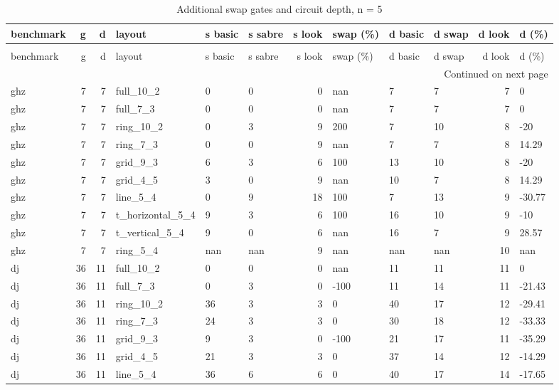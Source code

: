 \begin{longtable}{lrrlllrlllrl}
\caption{Additional swap gates and circuit depth, n = 5} \label{benchmark-table-5} \\
\toprule
benchmark & g & d & layout & s basic & s sabre & s look & swap (\%) & d basic & d swap & d look & d (\%) \\
\midrule
\endfirsthead
\caption[]{Additional swap gates and circuit depth, n = 5} \\
\toprule
benchmark & g & d & layout & s basic & s sabre & s look & swap (\%) & d basic & d swap & d look & d (\%) \\
\midrule
\endhead
\midrule
\multicolumn{12}{r}{Continued on next page} \\
\midrule
\endfoot
\bottomrule
\endlastfoot
ghz & 7 & 7 & full\_10\_2 & 0 & 0 & 0 & nan & 7 & 7 & 7 & 0 \\
ghz & 7 & 7 & full\_7\_3 & 0 & 0 & 0 & nan & 7 & 7 & 7 & 0 \\
ghz & 7 & 7 & ring\_10\_2 & 0 & 3 & 9 & 200 & 7 & 10 & 8 & -20 \\
ghz & 7 & 7 & ring\_7\_3 & 0 & 0 & 9 & nan & 7 & 7 & 8 & 14.29 \\
ghz & 7 & 7 & grid\_9\_3 & 6 & 3 & 6 & 100 & 13 & 10 & 8 & -20 \\
ghz & 7 & 7 & grid\_4\_5 & 3 & 0 & 9 & nan & 10 & 7 & 8 & 14.29 \\
ghz & 7 & 7 & line\_5\_4 & 0 & 9 & 18 & 100 & 7 & 13 & 9 & -30.77 \\
ghz & 7 & 7 & t\_horizontal\_5\_4 & 9 & 3 & 6 & 100 & 16 & 10 & 9 & -10 \\
ghz & 7 & 7 & t\_vertical\_5\_4 & 9 & 0 & 6 & nan & 16 & 7 & 9 & 28.57 \\
ghz & 7 & 7 & ring\_5\_4 & nan & nan & 9 & nan & nan & nan & 10 & nan \\
dj & 36 & 11 & full\_10\_2 & 0 & 0 & 0 & nan & 11 & 11 & 11 & 0 \\
dj & 36 & 11 & full\_7\_3 & 0 & 3 & 0 & -100 & 11 & 14 & 11 & -21.43 \\
dj & 36 & 11 & ring\_10\_2 & 36 & 3 & 3 & 0 & 40 & 17 & 12 & -29.41 \\
dj & 36 & 11 & ring\_7\_3 & 24 & 3 & 3 & 0 & 30 & 18 & 12 & -33.33 \\
dj & 36 & 11 & grid\_9\_3 & 9 & 3 & 0 & -100 & 21 & 17 & 11 & -35.29 \\
dj & 36 & 11 & grid\_4\_5 & 21 & 3 & 3 & 0 & 37 & 14 & 12 & -14.29 \\
dj & 36 & 11 & line\_5\_4 & 36 & 6 & 6 & 0 & 40 & 17 & 14 & -17.65 \\

\end{longtable}
